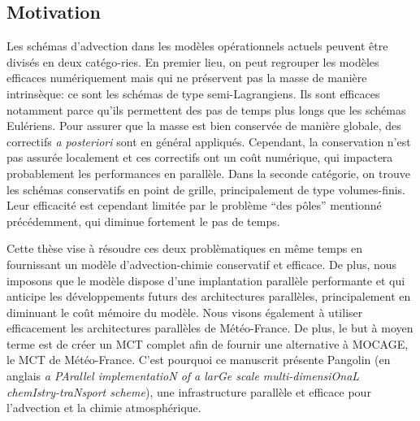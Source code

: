 \subsection*{Motivation}
Les schémas d'advection dans les modèles opérationnels actuels peuvent être
divisés en deux catégo-ries. En premier lieu, on peut regrouper les modèles
efficaces numériquement mais qui ne préservent pas la masse de manière
intrinsèque: ce sont les schémas de type semi-Lagrangiens. Ils sont efficaces
notamment parce qu'ils permettent des pas de temps plus longs que les schémas
Eulériens. Pour assurer que la masse est bien conservée de manière globale, des
correctifs \textit{a posteriori} sont en général appliqués. Cependant, la
conservation n'est pas assurée localement et ces correctifs ont un coût
numérique, qui impactera probablement les performances en parallèle. Dans la
seconde catégorie, on trouve les schémas conservatifs en point de grille,
principalement de type volumes-finis. Leur efficacité est cependant limitée par le
problème \enquote{des p\^oles} mentionné précédemment, qui diminue fortement le pas de
temps.

Cette thèse vise à résoudre ces deux problèmatiques en même temps en fournissant
un modèle d'advection-chimie conservatif et efficace. De plus, nous imposons que
le modèle dispose d'une implantation parallèle performante et qui anticipe les
développements futurs des architectures parallèles, principalement en diminuant
le coût mémoire du modèle. Nous visons également à utiliser efficacement les
architectures parallèles de Météo-France. De plus, le but à moyen terme est de
créer un MCT complet afin de fournir une alternative à MOCAGE, le MCT de
Météo-France. C'est pourquoi ce manuscrit présente Pangolin (en
anglais \textit{a PArallel implementatioN of a larGe scale multi-dimensiOnaL
chemIstry-traNsport scheme}), une infrastructure parallèle et efficace
pour l'advection et la chimie atmosphérique.


